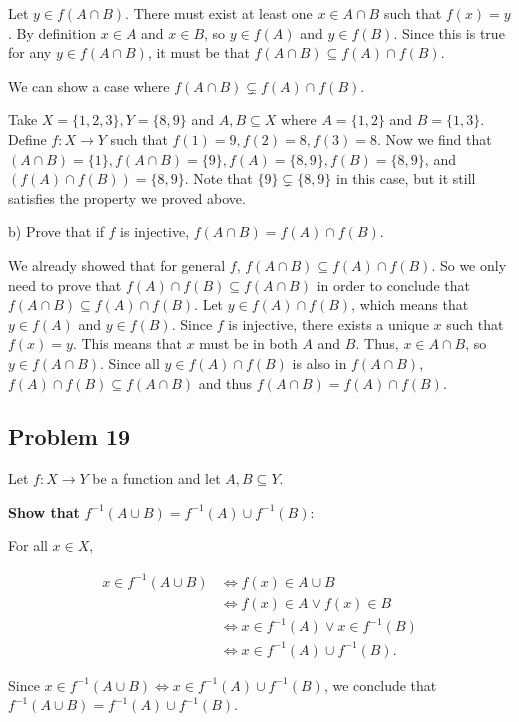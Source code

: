\documentclass[11pt]{article}
\begin{document}
Let $y \in f(A \cap B)$. There must exist at least one $x \in A \cap B$ such that $f(x)=y$. 
By definition $x \in A$ and $x \in B$, so $y \in f(A)$ and $y \in f(B)$.
Since this is true for 
any $y \in f(A \cap B)$, it must be that $f(A \cap B) \subseteq f(A) \cap f(B)$.

We can show a case where $f(A \cap B) \subsetneq f(A) \cap f(B)$.

Take $X = \{ 1, 2, 3 \}, Y = \{ 8, 9\}$ and $A, B \subseteq X$ where $A = \{1, 2\}$
and $B = \{1, 3\}$. Define $f:X\to Y$ such that $f(1) = 9, f(2) = 8, f(3) = 8$.
Now we find that $(A \cap B) = \{1\}, f(A \cap B) = \{9\}, f(A) = \{8, 9\},
f(B) = \{8, 9\}$, and $(f(A) \cap f(B)) = \{8, 9\}$. Note that $\{9\} \subsetneq \{8, 9\}$
in this case, but it still satisfies the property we proved above. 

b) Prove that if $f$ is injective, $f(A \cap B) = f(A) \cap f(B)$.

We already showed that for general $f$, $f(A \cap B) \subseteq f(A) \cap f(B)$. So we only
need to prove that $f(A) \cap f(B) \subseteq f(A \cap B)$ in order to conclude that
$f(A \cap B) \subseteq f(A) \cap f(B)$. Let $y \in f(A) \cap f(B)$, which means that 
$y \in f(A)$ and $y \in f(B)$. Since $f$ is injective, there exists a unique $x$ such
that $f(x) = y$. This means that $x$ must be in both $A$ and $B$. Thus, $x \in A\cap B$, 
so $y \in f(A \cap B)$. Since all $y \in f(A) \cap f(B)$ is also in $f(A \cap B)$, 
$f(A) \cap f(B) \subseteq f(A \cap B)$ and thus $f(A \cap B) = f(A) \cap f(B)$.

\subsection*{Problem 19}

Let $f : X \to Y$ be a function and let $A, B \subseteq Y$.

\textbf{Show that} $f^{-1}(A \cup B) = f^{-1}(A) \cup f^{-1}(B)$:

For all $x \in X$,

$$
\begin{array}{rl}
x \in f^{-1}(A \cup B) &\iff f(x) \in A \cup B \\
&\iff f(x) \in A \lor f(x) \in B \\
&\iff x \in f^{-1}(A) \lor x \in f^{-1}(B) \\
&\iff x \in f^{-1}(A) \cup f^{-1}(B).
\end{array}
$$

Since $x \in f^{-1}(A \cup B) \iff x \in f^{-1}(A) \cup f^{-1}(B)$,
we conclude that $f^{-1}(A \cup B) = f^{-1}(A) \cup f^{-1}(B)$.
\end{document}
